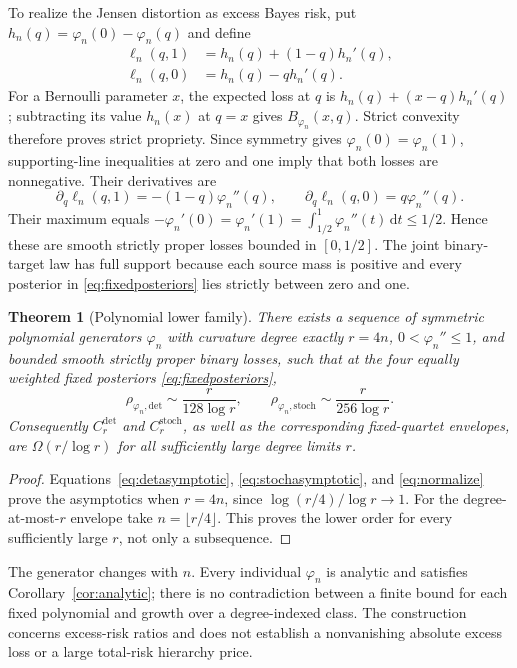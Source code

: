 \documentclass[11pt]{article}
\newtheorem{theorem}{Theorem}[section]
\theoremstyle{definition}\newtheorem{definition}[theorem]{Definition}
\theoremstyle{remark}\newtheorem{remark}[theorem]{Remark}
\newcommand{\ph}{\varphi}
\newcommand{\rd}{\,\mathrm d}
\newcommand{\detp}{\mathrm{det}}
\newcommand{\stp}{\mathrm{stoch}}
\begin{document}
To realize the Jensen distortion as excess Bayes risk, put $h_n(q)=\ph_n(0)-\ph_n(q)$ and define
\begin{align}
\ell_n(q,1)&=h_n(q)+(1-q)h_n'(q),\label{eq:properloss}\\
\ell_n(q,0)&=h_n(q)-qh_n'(q).\nonumber
\end{align}
For a Bernoulli parameter $x$, the expected loss at $q$ is
$h_n(q)+(x-q)h_n'(q)$; subtracting its value $h_n(x)$ at $q=x$ gives $B_{\ph_n}(x,q)$. Strict convexity therefore proves strict propriety. Since symmetry gives $\ph_n(0)=\ph_n(1)$, supporting-line inequalities at zero and one imply that both losses are nonnegative. Their derivatives are
\[
\partial_q\ell_n(q,1)=-(1-q)\ph_n''(q),\qquad
\partial_q\ell_n(q,0)=q\ph_n''(q).
\]
Their maximum equals $-\ph_n'(0)=\ph_n'(1)=\int_{1/2}^1\ph_n''(t)\rd t\le1/2$. Hence these are smooth strictly proper losses bounded in $[0,1/2]$. The joint binary-target law has full support because each source mass is positive and every posterior in \eqref{eq:fixedposteriors} lies strictly between zero and one.

\begin{theorem}[Polynomial lower family]
\label{thm:lower}
There exists a sequence of symmetric polynomial generators $\ph_n$ with curvature degree exactly $r=4n$, $0<\ph_n''\le1$, and bounded smooth strictly proper binary losses, such that at the four equally weighted fixed posteriors \eqref{eq:fixedposteriors},
\begin{equation}
\rho_{\ph_n,\detp}\sim\frac{r}{128\log r},\qquad
\rho_{\ph_n,\stp}\sim\frac{r}{256\log r}.
\label{eq:lowerfinal}
\end{equation}
Consequently $C_r^{\detp}$ and $C_r^{\stp}$, as well as the corresponding fixed-quartet envelopes, are $\Omega(r/\log r)$ for all sufficiently large degree limits $r$.
\end{theorem}
\begin{proof}
Equations~\eqref{eq:detasymptotic}, \eqref{eq:stochasymptotic}, and \eqref{eq:normalize} prove the asymptotics when $r=4n$, since $\log(r/4)/\log r\to1$. For the degree-at-most-$r$ envelope take $n=\lfloor r/4\rfloor$. This proves the lower order for every sufficiently large $r$, not only a subsequence.
\end{proof}

The generator changes with $n$. Every individual $\ph_n$ is analytic and satisfies Corollary~\ref{cor:analytic}; there is no contradiction between a finite bound for each fixed polynomial and growth over a degree-indexed class. The construction concerns excess-risk ratios and does not establish a nonvanishing absolute excess loss or a large total-risk hierarchy price.
\end{document}
